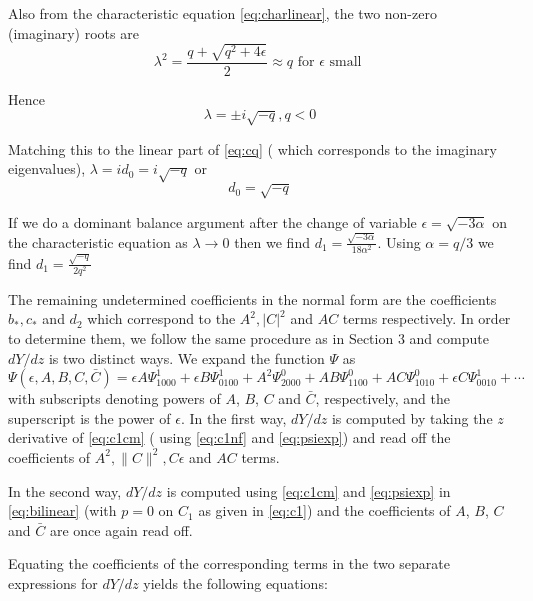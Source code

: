 Also from the characteristic equation \eqref{eq:charlinear}, the two non-zero 
(imaginary) roots are 
\begin{equation}
\lambda^2 = \frac{ q + \sqrt{q^2 + 4 \epsilon } }{2} \approx q \textrm{ for } \epsilon \textrm{ small }
\end{equation}

Hence
\begin{equation}
\lambda = \pm i \sqrt{-q}, q < 0
\end{equation}

Matching this to the linear part of \eqref{eq:cq} ( which corresponds to the imaginary eigenvalues), $\lambda = i d_0 = i \sqrt{-q}$ or 
\begin{equation}
d_0 = \sqrt{-q}
\end{equation}


If we do a dominant balance argument after the change of variable $\epsilon = \sqrt{-3 \alpha}$ on the characteristic equation as $\lambda \rightarrow 0 $ then we find $d_1 = \frac{ \sqrt{-3 \alpha} }{18 \alpha^2 } $. Using $\alpha=q/3$ we find $d_1 = \frac{\sqrt{-q}}{2 q^2} $ 

The remaining undetermined coefficients  in the normal form are the 
coefficients $b_*,c_*$ and $d_2$ 
which correspond to the $A^2, |C|^2$ and $AC$ terms respectively. In 
order to determine them, we follow the same procedure as 
in Section 3 and compute $dY/dz$ is two distinct ways. We expand the
function $\Psi$ as
\begin{equation}\label{eq:psiexp}
\Psi(\epsilon,A,B,C,\bar{C}) = \epsilon A \Psi_{1000}^1 + \epsilon B \Psi_{0100}^1 + A^2 \Psi_{2000}^0 + A B \Psi_{1100}^0 + A C \Psi_{1010}^0 + \epsilon C \Psi_{0010}^1 + \cdots 
\end{equation}
with subscripts denoting powers of $A$, $B$, $C$ and $\bar{C}$, respectively,
and the superscript is the power of $\epsilon$. In the first way,
$dY/dz$ is computed by taking the $z$ derivative of \eqref{eq:c1cm} ( 
using \eqref{eq:c1nf} and \eqref{eq:psiexp}) and read off the coefficients
of $A^2, \|C\|^2, C \epsilon$ and $AC$ terms.

In the second way, $dY/dz$ is computed using 
\eqref{eq:c1cm} and \eqref{eq:psiexp} in \eqref{eq:bilinear} 
(with $p=0$ on $C_1$ as given in \eqref{eq:c1})
and the coefficients of  $A$, $B$, $C$ and $\bar{C}$ are once
again read off.

Equating the coefficients of the corresponding terms in the two
separate expressions for $dY/dz$ yields the following equations:

